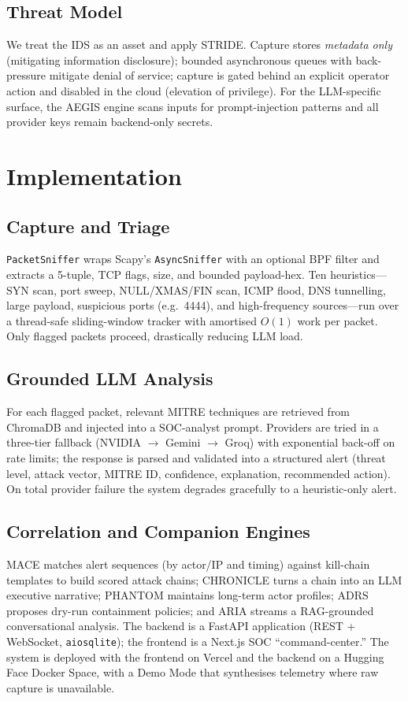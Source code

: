 \documentclass[conference]{IEEEtran}
\begin{document}
\subsection{Threat Model}
We treat the IDS as an asset and apply STRIDE. Capture stores \emph{metadata only} (mitigating information disclosure); bounded asynchronous queues with back-pressure mitigate denial of service; capture is gated behind an explicit operator action and disabled in the cloud (elevation of privilege). For the LLM-specific surface, the AEGIS engine scans inputs for prompt-injection patterns and all provider keys remain backend-only secrets.

\section{Implementation}
\subsection{Capture and Triage}
\texttt{PacketSniffer} wraps Scapy's \texttt{AsyncSniffer} with an optional BPF filter and extracts a 5-tuple, TCP flags, size, and bounded payload-hex. Ten heuristics---SYN scan, port sweep, NULL/XMAS/FIN scan, ICMP flood, DNS tunnelling, large payload, suspicious ports (e.g.\ 4444), and high-frequency sources---run over a thread-safe sliding-window tracker with amortised $O(1)$ work per packet. Only flagged packets proceed, drastically reducing LLM load.

\subsection{Grounded LLM Analysis}
For each flagged packet, relevant MITRE techniques are retrieved from ChromaDB and injected into a SOC-analyst prompt. Providers are tried in a three-tier fallback (NVIDIA $\rightarrow$ Gemini $\rightarrow$ Groq) with exponential back-off on rate limits; the response is parsed and validated into a structured alert (threat level, attack vector, MITRE ID, confidence, explanation, recommended action). On total provider failure the system degrades gracefully to a heuristic-only alert.

\subsection{Correlation and Companion Engines}
MACE matches alert sequences (by actor/IP and timing) against kill-chain templates to build scored attack chains; CHRONICLE turns a chain into an LLM executive narrative; PHANTOM maintains long-term actor profiles; ADRS proposes dry-run containment policies; and ARIA streams a RAG-grounded conversational analysis. The backend is a FastAPI application (REST + WebSocket, \texttt{aiosqlite}); the frontend is a Next.js SOC ``command-center.'' The system is deployed with the frontend on Vercel and the backend on a Hugging Face Docker Space, with a Demo Mode that synthesises telemetry where raw capture is unavailable.
\end{document}
